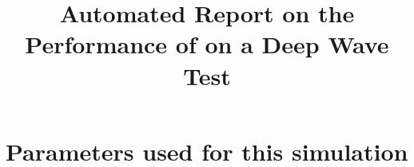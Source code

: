 \documentclass[11pt,a4paper]{article}
\begin{document}
 

\title{Automated Report on the Performance of \anuga{} on a Deep Wave Test}
\maketitle




\section{Parameters used for this simulation}






\end{document}
